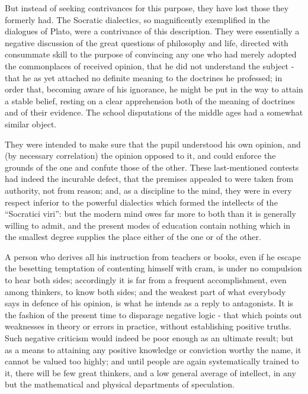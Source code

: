 But instead of seeking contrivances for this purpose, they have lost those they formerly had. The Socratic dialectics, so magnificently exemplified in the dialogues of Plato, were a contrivance of this description. They were essentially a negative discussion of the great questions of philosophy and life, directed with consummate skill to the purpose of convincing any one who had merely adopted the commonplaces of received opinion, that he did not understand the subject - that he as yet attached no definite meaning to the doctrines he professed; in order that, becoming aware of his ignorance, he might be put in the way to attain a stable belief, resting on a clear apprehension both of the meaning of doctrines and of their evidence. The school disputations of the middle ages had a somewhat similar object.\par

They were intended to make sure that the pupil understood his own opinion, and (by necessary correlation) the opinion opposed to it, and could enforce the grounds of the one and confute those of the other. These last-mentioned contests had indeed the incurable defect, that the premises appealed to were taken from authority, not from reason; and, as a discipline to the mind, they were in every respect inferior to the powerful dialectics which formed the intellects of the “Socratici viri”: but the modern mind owes far more to both than it is generally willing to admit, and the present modes of education contain nothing which in the smallest degree supplies the place either of the one or of the other.\par

A person who derives all his instruction from teachers or books, even if he escape the besetting temptation of contenting himself with cram, is under no compulsion to hear both sides; accordingly it is far from a frequent accomplishment, even among thinkers, to know both sides; and the weakest part of what everybody says in defence of his opinion, is what he intends as a reply to antagonists. It is the fashion of the present time to disparage negative logic - that which points out weaknesses in theory or errors in practice, without establishing positive truths. Such negative criticism would indeed be poor enough as an ultimate result; but as a means to attaining any positive knowledge or conviction worthy the name, it cannot be valued too highly; and until people are again systematically trained to it, there will be few great thinkers, and a low general average of intellect, in any but the mathematical and physical departments of speculation.\par

